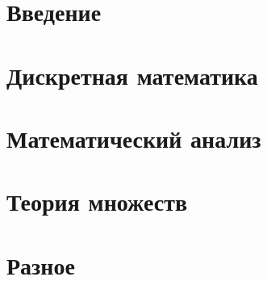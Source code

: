 \documentclass{report}
\begin{document}
\chapter*{Введение}

\tableofcontents
\chapter{Дискретная математика}

	
	
	

	
\chapter{Математический анализ}

\chapter{Теория множеств}

	
	
	
	
\chapter{Разное}
\end{document}
